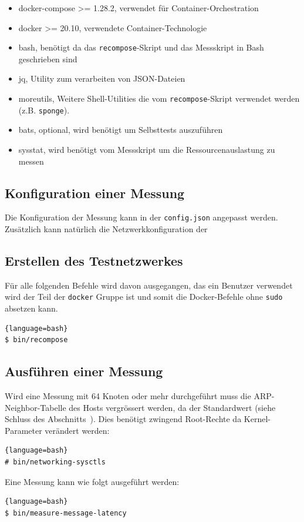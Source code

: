 \begin{itemize}
    \item docker-compose >= 1.28.2, verwendet für Container-Orchestration
    \item docker >= 20.10, verwendete Container-Technologie
    \item bash, benötigt da das \lstinline|recompose|-Skript und das Messskript in Bash geschrieben sind
    \item jq, Utility zum verarbeiten von JSON-Dateien
    \item moreutils, Weitere Shell-Utilities die vom \lstinline|recompose|-Skript verwendet werden (z.B. \lstinline|sponge|).
    \item bats, optional, wird benötigt um Selbsttests auszuführen
    \item sysstat, wird benötigt vom Messskript um die Ressourcenauslastung zu messen
\end{itemize}


\subsection{Konfiguration einer Messung}

Die Konfiguration der Messung kann in der \lstinline|config.json| angepasst werden.
Zusätzlich kann natürlich die Netzwerkkonfiguration der

\subsection{Erstellen des Testnetzwerkes}

Für alle folgenden Befehle wird davon ausgegangen, das ein Benutzer verwendet wird der Teil der \lstinline|docker| Gruppe ist und somit die Docker-Befehle ohne \lstinline|sudo| absetzen kann.

\begin{lstlisting}{language=bash}
$ bin/recompose
\end{lstlisting}


\subsection{Ausführen einer Messung}

Wird eine Messung mit 64 Knoten oder mehr durchgeführt muss die ARP-Neighbor-Tabelle des Hosts vergrössert werden, da der Standardwert  (siehe Schluss des Abschnitts~). Dies benötigt zwingend Root-Rechte da Kernel-Parameter verändert werden:

\begin{lstlisting}{language=bash}
# bin/networking-sysctls
\end{lstlisting}

Eine Messung kann wie folgt ausgeführt werden:

\begin{lstlisting}{language=bash}
$ bin/measure-message-latency
\end{lstlisting}
